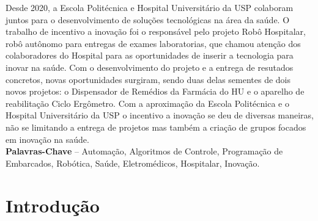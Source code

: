 \documentclass[]{politex}
\begin{document}
\begin{resumo}
Desde 2020, a Escola Politécnica e Hospital Universitário da USP colaboram juntos para o desenvolvimento de soluções tecnológicas na área da saúde. O trabalho de incentivo a inovação foi o responsável pelo projeto Robô Hospitalar, robô autônomo para entregas de exames laboratorias, que chamou atenção dos colaboradores do Hospital para as oportunidades de inserir a tecnologia para inovar na saúde. Com o desenvolvimento do projeto e a entrega de resutados concretos, novas oportunidades surgiram, sendo duas delas sementes de dois novos projetos: o Dispensador de Remédios da Farmácia do HU e o aparelho de reabilitação Ciclo Ergômetro. Com a aproximação da Escola Politécnica e o Hospital Universitário da USP o incentivo a inovação se deu de diversas maneiras, não se limitando a entrega de projetos mas também a criação de grupos focados em inovação na saúde.
%
\\[3\baselineskip]
%
\textbf{Palavras-Chave} -- Automação, Algoritmos de Controle, Programação de Embarcados, Robótica, Saúde, Eletromédicos, Hospitalar, Inovação.
\end{resumo}

\begin{comment}

\begin{abstract}
Abstract...
%
\\[3\baselineskip]
%
\textbf{Keywords} -- Word, Word, Word, Word, Word.
\end{abstract}
\end{comment}
\listadefiguras
\listadetabelas

\sumario


\part{Introdução}



\end{document}
